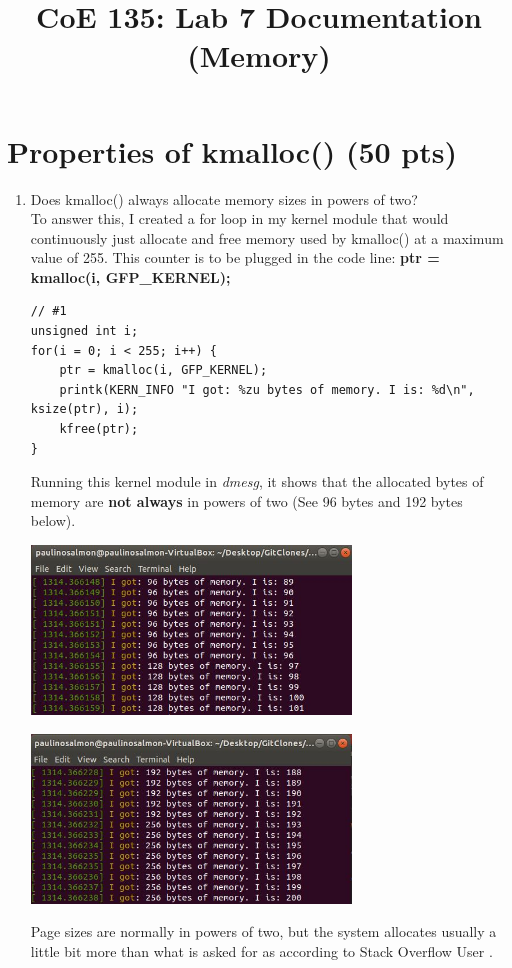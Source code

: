 \documentclass[conference]{IEEEtran}
\newcommand\tab[1][0.5cm]{\hspace*{#1}}
\begin{document}
\title{CoE 135: Lab 7 Documentation (Memory)\\
}

\author{
	}		
\maketitle

\section{Properties of kmalloc() (50 pts)}
\begin{enumerate}
\item Does kmalloc() always allocate memory sizes in powers of two? \\
\tab To answer this, I created a for loop in my kernel module that would continuously just allocate and free memory used by kmalloc() at a maximum value of 255. This counter is to be plugged in the code line: \textbf{ptr = kmalloc(i, GFP\_KERNEL);}
\begin{lstlisting}
// #1
unsigned int i;
for(i = 0; i < 255; i++) {
	ptr = kmalloc(i, GFP_KERNEL);
	printk(KERN_INFO "I got: %zu bytes of memory. I is: %d\n", ksize(ptr), i);
	kfree(ptr);
}
\end{lstlisting}
\tab Running this kernel module in \textit{dmesg}, it shows that the allocated bytes of memory are \textbf{not always} in powers of two (See 96 bytes and 192 bytes below).
\begin{center}
	\includegraphics[width=8.5cm, height=4.5cm]{memory1.JPG}
\end{center}
\begin{center}
	\includegraphics[width=8.5cm, height=4.5cm]{memory2.JPG}
\end{center}
\tab Page sizes are normally in powers of two, but the system allocates usually a little bit more than what is asked for as according to Stack Overflow User \textcite{kmalloc}. \\


\end{enumerate}
\end{document}
